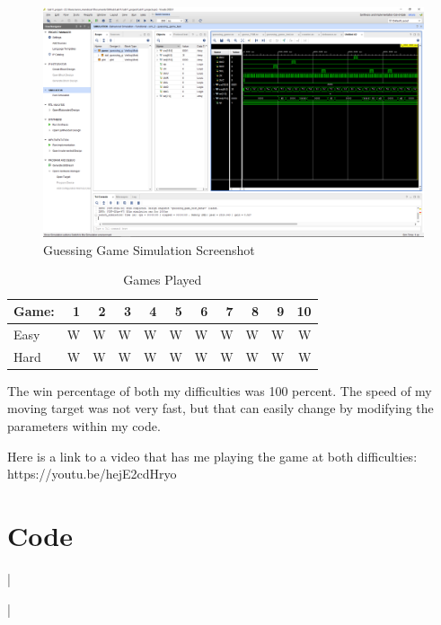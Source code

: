 \documentclass[11pt]{article}
\newcommand{\Verilog}[2][]{%
	
}
\begin{document}
\begin{figure}[ht]\centering
	\includegraphics[width=1\textwidth,trim=26cm 15.5cm 0.5cm 4.5cm,clip]{guessing_game_test_screenshot}
	\caption{Guessing Game Simulation Screenshot}
	\label{fig:sim_with_table}
\end{figure}

\FloatBarrier

\begin{table}[ht]\centering
	\caption{Games Played}
	\label{ALU:tbl:alu_ERT}\medskip
	\begin{tabular}{l|rrrrrrrrrr}
		Game: & 1 & 2 & 3 & 4 & 5 & 6 & 7 & 8 & 9 & 10 \\
		\midrule
		Easy & W & W & W & W & W & W & W & W & W & W \\
		Hard & W & W & W & W & W & W & W & W & W & W \\
		\bottomrule
	\end{tabular}
\end{table}

\FloatBarrier

The win percentage of both my difficulties was 100 percent. The speed of my moving target was not very fast, but that can easily change by modifying the parameters within my code.

Here is a link to a video that has me playing the game at both difficulties: https://youtu.be/hejE2cdHryo

\section*{Code}

\Verilog[firstline=1, lastline=76, caption=Debounce Module Code]{Lab11_project/codedirectory/debounce.sv}|

\Verilog[firstline=1, lastline=35, caption=Debounce Testbench Code]{Lab11_project/codedirectory/debounce_test.sv}|
\end{document}
